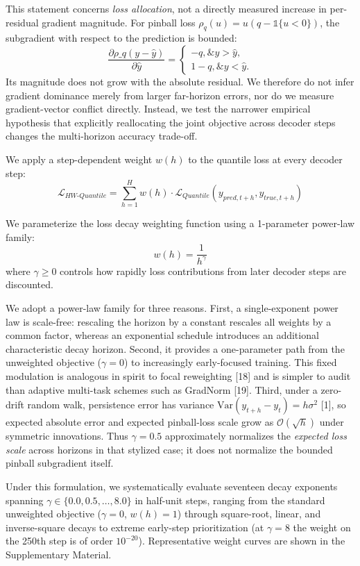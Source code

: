 \documentclass[review,3p,times]{elsarticle}
\begin{document}
This statement concerns \emph{loss allocation}, not a directly measured increase in per-residual gradient magnitude. For pinball loss $\rho_q(u)=u(q-\mathbb{1}\{u<0\})$, the subgradient with respect to the prediction is bounded:
$$\frac{\partial \rho\_q(y-\hat y)}{\partial \hat y} =
\begin{cases}
-q, \& y>\hat y,\\
1-q, \& y<\hat y.
\end{cases}$$
Its magnitude does not grow with the absolute residual. We therefore do not infer gradient dominance merely from larger far-horizon errors, nor do we measure gradient-vector conflict directly. Instead, we test the narrower empirical hypothesis that explicitly reallocating the joint objective across decoder steps changes the multi-horizon accuracy trade-off.

We apply a step-dependent weight $w(h)$ to the quantile loss at every decoder step:
\[\mathcal{L}_{HW\text{-}Quantile} = \sum_{h=1}^{H} w(h) \cdot \mathcal{L}_{Quantile}(y_{pred, t+h}, y_{true, t+h})\]

We parameterize the loss decay weighting function using a 1-parameter power-law family:
\[w(h) = \frac{1}{h^\gamma}\]
where $\gamma \ge 0$ controls how rapidly loss contributions from later decoder steps are discounted.

We adopt a power-law family for three reasons. First, a single-exponent power law is scale-free: rescaling the horizon by a constant rescales all weights by a common factor, whereas an exponential schedule introduces an additional characteristic decay horizon. Second, it provides a one-parameter path from the unweighted objective ($\gamma=0$) to increasingly early-focused training. This fixed modulation is analogous in spirit to focal reweighting [18] and is simpler to audit than adaptive multi-task schemes such as GradNorm [19]. Third, under a zero-drift random walk, persistence error has variance $\text{Var}(y_{t+h}-y_t)=h\sigma^2$ [1], so expected absolute error and expected pinball-loss scale grow as $\mathcal{O}(\sqrt{h})$ under symmetric innovations. Thus $\gamma=0.5$ approximately normalizes the \emph{expected loss scale} across horizons in that stylized case; it does not normalize the bounded pinball subgradient itself.

Under this formulation, we systematically evaluate seventeen decay exponents spanning $\gamma \in \{0.0, 0.5, \dots, 8.0\}$ in half-unit steps, ranging from the standard unweighted objective ($\gamma = 0$, $w(h) = 1$) through square-root, linear, and inverse-square decays to extreme early-step prioritization (at $\gamma = 8$ the weight on the 250th step is of order $10^{-20}$). Representative weight curves are shown in the Supplementary Material.
\end{document}
